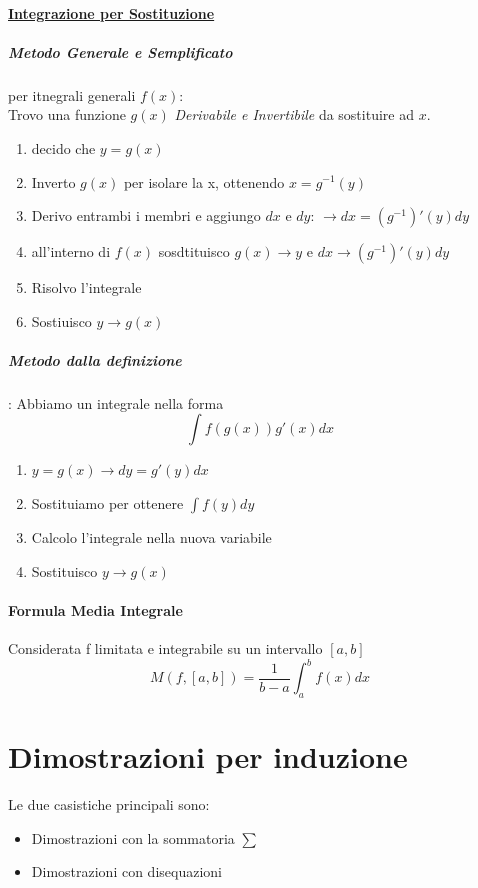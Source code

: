 \documentclass[12pt, a4paper, openany]{book}
\begin{document}
\paragraph*{\underline{Integrazione per Sostituzione}}
\subparagraph*{\emph{Metodo Generale e Semplificato}} per itnegrali generali $f(x)$:
\\Trovo una funzione $g(x)$ \emph{Derivabile e Invertibile} da sostituire ad $x$.
\begin{enumerate}
	\item decido che $y=g(x)$
	\item Inverto $g(x)$ per isolare la x, ottenendo $x=g^{-1}(y)$
	\item Derivo entrambi i membri e aggiungo $dx$ e $dy$: $\to dx=(g^{-1})'(y)dy$
	\item all'interno di $f(x)$ sosdtituisco $g(x) \to y$ e $dx \to (g^{-1})'(y)dy$
	\item Risolvo l'integrale
	\item Sostiuisco $y \to g(x)$
\end{enumerate}
\subparagraph*{Metodo dalla definizione}: Abbiamo un integrale nella forma
$$\int f(g(x))g'(x) dx$$
\begin{enumerate}
	\item $y=g(x)\to dy=g'(y)dx$
	\item Sostituiamo per ottenere $\int f(y)dy$
	\item Calcolo l'integrale nella nuova variabile
	\item Sostituisco $y\to g(x)$
\end{enumerate}

\paragraph*{Formula Media Integrale}
Considerata f limitata e integrabile su un intervallo $[a,b]$
\begin{equation*}
	M(f,[a,b])=\frac{1}{b-a}\int_a^b f(x)dx
\end{equation*}

\section{Dimostrazioni per induzione}
Le due casistiche principali sono:
\begin{itemize}
	\item Dimostrazioni con la sommatoria $\sum$
	\item Dimostrazioni con disequazioni
\end{itemize}
\end{document}
